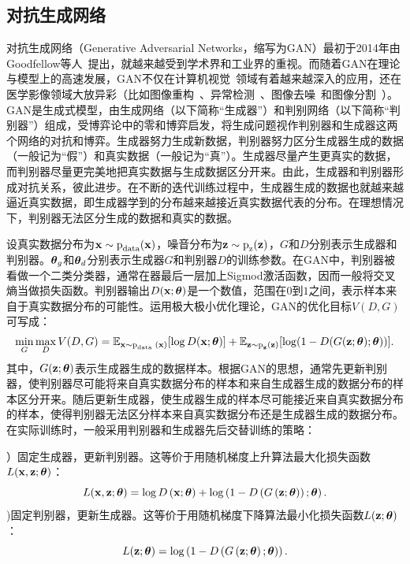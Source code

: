 \subsection{对抗生成网络}\label{subsec:gan_introduction}
对抗生成网络（Generative Adversarial Networks，缩写为GAN）最初于2014年由Goodfellow等人~\cite{goodfellow2014generative}提出，就越来越受到学术界和工业界的重视。而随着GAN在理论与模型上的高速发展，GAN不仅在计算机视觉~\cite{zhu2017unpaired}领域有着越来越深入的应用，还在医学影像领域大放异彩（比如图像重构~\cite{bhadra2020medical}、异常检测~\cite{Kohl2017AdversarialNF}、图像去噪~\cite{Yang2018LowDoseCI}和图像分割~\cite{Han2018SpineGANSS}）。GAN是生成式模型，由生成网络（以下简称“生成器”）和判别网络（以下简称“判别器”）组成，受博弈论中的零和博弈启发，将生成问题视作判别器和生成器这两个网络的对抗和博弈。生成器努力生成新数据，判别器努力区分生成器生成的数据（一般记为“假”）和真实数据（一般记为“真”）。生成器尽量产生更真实的数据，而判别器尽量更完美地把真实数据与生成数据区分开来。由此，生成器和判别器形成对抗关系，彼此进步。在不断的迭代训练过程中，生成器生成的数据也就越来越逼近真实数据，即生成器学到的分布越来越接近真实数据代表的分布。在理想情况下，判别器无法区分生成的数据和真实的数据。

设真实数据分布为$\mathbf{x}\sim \text{p}_{\text{data}}(\mathbf{x})$，噪音分布为$\mathbf{z}\sim \text{p}_{\text{z}}(\mathbf{z})$，$G$和$D$分别表示生成器和判别器。$\mbox{\boldmath $\theta$}_{g}$和$\mbox{\boldmath $\theta$}_{d}$分别表示生成器$G$和判别器$D$的训练参数。在GAN中，判别器被看做一个二类分类器，通常在器最后一层加上Sigmod激活函数，因而一般将交叉熵当做损失函数。判别器输出$D(\mathbf{x};\mbox{\boldmath $\theta$})$是一个数值，范围在$0$到$1$之间，表示样本来自于真实数据分布的可能性。运用极大极小优化理论，GAN的优化目标$V(D, G)$可写成：
\begin{eqnarray}\label{equ:gan_loss_func}
\min _{G} \max _{D} V(D, G)=\mathbb{E}_{ \mathbf{x} \sim \text{p}_{\text {data }}(\mathbf{x})}[\log D(\mathbf{x};\mbox{\boldmath $\theta$})]+\mathbb{E}_{\mathbf{z} \sim \text{p}_{\mathbf{z}}(\mathbf{z})}[\log (1-D(G(\mathbf{z};\mbox{\boldmath $\theta$});\mbox{\boldmath $\theta$}))].
\end{eqnarray}
\noindent 其中，$G(\mathbf{z};\mbox{\boldmath $\theta$})$表示生成器生成的数据样本。根据GAN的思想，通常先更新判别器，使判别器尽可能将来自真实数据分布的样本和来自生成器生成的数据分布的样本区分开来。随后更新生成器，使生成器生成的样本尽可能接近来自真实数据分布的样本，使得判别器无法区分样本来自真实数据分布还是生成器生成的数据分布。在实际训练时，一般采用判别器和生成器先后交替训练的策略：


）固定生成器，更新判别器。这等价于用随机梯度上升算法最大化损失函数$L(\mathbf{x},\mathbf{z};\mbox{\boldmath $\theta$})$：
	\begin{equation}
	L(\mathbf{x},\mathbf{z};\mbox{\boldmath $\theta$})=\log D\left(\mathbf{x};\mbox{\boldmath $\theta$}\right)+\log \left(1-D\left(G\left(\mathbf{z};\mbox{\boldmath $\theta$}\right)\right);\mbox{\boldmath $\theta$}\right).
	\end{equation}
)固定判别器，更新生成器。这等价于用随机梯度下降算法最小化损失函数$L(\mathbf{z};\mbox{\boldmath $\theta$})$：
	\begin{equation}
	L(\mathbf{z};\mbox{\boldmath $\theta$})=\log \left(1-D\left(G\left(\mathbf{z};\mbox{\boldmath $\theta$}\right);\mbox{\boldmath $\theta$}\right)\right).
	\end{equation}

